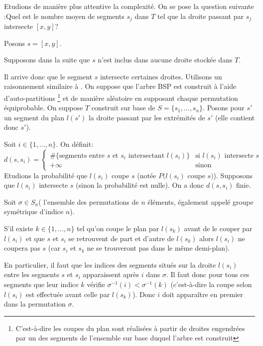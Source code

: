 Etudions de manière plus attentive la complexité. On se pose la
question suivante :\og Quel est le nombre moyen de segments
$s_j$ dans $T$ tel que la droite passant par $s_j$ intersecte
$[x,y]$?\fg


Posons $s = [x,y]$.

Supposons dans la suite que $s$ n'est inclus dans aucune droite
stockée dans $T$.

Il arrive donc que le segment $s$ intersecte certaines droites.
Utilisons un raisonnement similaire à
\cite{berg_cheong_kreveld_2008}. On suppose que
l'arbre BSP est construit à l'aide d'auto-partitions
\footnote{
  C'est-à-dire les coupes du plan sont réalisées à partir de
  droites engendrées par un des segments de l'ensemble sur
  base duquel l'arbre est construit}
et de manière aléatoire en supposant chaque permutation
équiprobable. On suppose $T$ construit sur base de
$S = \{s_1,...,s_n\}$. Posons pour $s'$ un segment du plan $l(s')$
la droite passant par les extrémités de $s'$ (elle contient donc
$s'$).

Soit $ i \in \{1,...,n\}$. On définit:
$$ d(s,s_i )= \begin{cases}
  \mbox{\#\{segments entre } s \mbox{ et } s_i
  \mbox{ intersectant } l(s_i) \mbox{\}}
  &\mbox{si } l(s_i) \mbox { intersecte } s \\
  +\infty & \mbox{sinon} \end{cases} $$
Etudions la probabilité que $l(s_i)$ coupe $s$ (notée
$P(l(s_i)$ coupe $s)$). Supposons que $l(s_i)$ intersecte $s$
(sinon la probabilité est nulle). On a donc $d(s, s_i)$ finie.

Soit $\sigma  \in S_n $( l'ensemble des permutations de $n$
éléments, également appelé groupe symétrique d'indice $n$).

S'il existe $k\in\{1, \ldots, n\} $ tel qu'on coupe le plan par
$l(s_k)$ avant de le couper par $l(s_i)$ et que $s$ et $s_i$ se
retrouvent de part et d'autre de $l(s_k)$ alors $l(s_i)$ ne
coupera pas $s$ (car $s_i$ et $s_k$ ne se trouveront pas dans le
même demi-plan).

En particulier, il faut que les indices des segments situés sur
la droite $l(s_i)$ entre les segments $s$ et $s_i$ apparaissent
après $i$ dans $\sigma$. Il faut donc pour
tous ces segments que leur indice $k$ vérifie
$\sigma^{-1}(i)<\sigma^{-1}(k)$ (c'est-à-dire la coupe selon
$l(s_i)$ est effectuée avant celle par $l(s_k)$). Donc $i$ doit
apparaître en premier dans la permutation $\sigma$.


